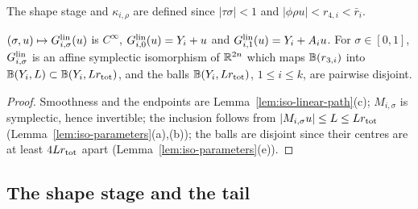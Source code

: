 The shape stage and $\kappa_{i,\rho}$ are defined since $|\tau\sigma|<1$ and $|\phi\rho u|<r_{4,i}<\bar r_i$.

\begin{lemma}\label{lem:iso-linear-disjoint}
$(\sigma,u)\mapsto G^{\rm lin}_{i,\sigma}(u)$ is $C^\infty$, $G^{\rm lin}_{i,0}(u)=Y_i+u$ and $G^{\rm lin}_{i,1}(u)=Y_i+A_iu$. For
$\sigma\in[0,1]$, $G^{\rm lin}_{i,\sigma}$ is an affine symplectic isomorphism of $\mathbb{R}^{2n}$ which maps $\mathbb{B}(r_{3,i})$ into
$\mathbb{B}(Y_i,L)\subset\mathbb{B}(Y_i,Lr_{\rm tot})$, and the balls $\mathbb{B}(Y_i,Lr_{\rm tot})$, $1\le i\le k$, are pairwise disjoint.
\end{lemma}

\begin{proof}
Smoothness and the endpoints are Lemma~\ref{lem:iso-linear-path}(c); $M_{i,\sigma}$ is symplectic, hence invertible; the inclusion follows from $|M_{i,\sigma}u|\le L\le Lr_{\rm tot}$ (Lemma~\ref{lem:iso-parameters}(a),(b)); the balls are disjoint since their centres are at least $4Lr_{\rm tot}$ apart (Lemma~\ref{lem:iso-parameters}(e)).
\end{proof}

\subsection{The shape stage and the tail}\label{sec:iso-shape}

